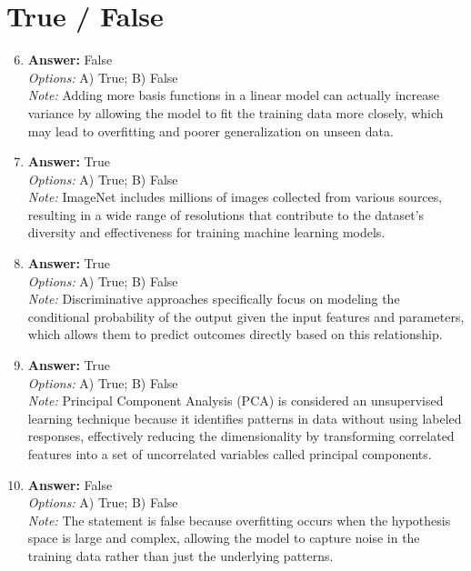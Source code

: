 \documentclass[12pt]{article}
\begin{document}
\section*{True / False}
\begin{enumerate}[label=\arabic*.]
\setcounter{enumi}{5}
\item \textbf{Answer:} False
\\ \textit{Options:} A) True; B) False
\\ \textit{Note:} Adding more basis functions in a linear model can actually increase variance by allowing the model to fit the training data more closely, which may lead to overfitting and poorer generalization on unseen data.
\item \textbf{Answer:} True
\\ \textit{Options:} A) True; B) False
\\ \textit{Note:} ImageNet includes millions of images collected from various sources, resulting in a wide range of resolutions that contribute to the dataset's diversity and effectiveness for training machine learning models.
\item \textbf{Answer:} True
\\ \textit{Options:} A) True; B) False
\\ \textit{Note:} Discriminative approaches specifically focus on modeling the conditional probability of the output given the input features and parameters, which allows them to predict outcomes directly based on this relationship.
\item \textbf{Answer:} True
\\ \textit{Options:} A) True; B) False
\\ \textit{Note:} Principal Component Analysis (PCA) is considered an unsupervised learning technique because it identifies patterns in data without using labeled responses, effectively reducing the dimensionality by transforming correlated features into a set of uncorrelated variables called principal components.
\item \textbf{Answer:} False
\\ \textit{Options:} A) True; B) False
\\ \textit{Note:} The statement is false because overfitting occurs when the hypothesis space is large and complex, allowing the model to capture noise in the training data rather than just the underlying patterns.
\end{enumerate}
\end{document}
